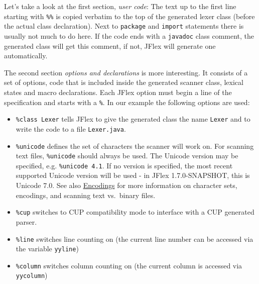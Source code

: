 
Let's take a look at the first section, \emph{user code}: The text up to
the first line starting with \texttt{\%\%} is copied verbatim to the top
of the generated lexer class (before the actual class declaration). Next
to \texttt{package} and \texttt{import} statements there is usually not
much to do here. If the code ends with a \texttt{javadoc} class comment,
the generated class will get this comment, if not, JFlex will generate
one automatically.


The second section \emph{options and declarations} is more interesting.
It consists of a set of options, code that is included inside the
generated scanner class, lexical states and macro declarations. Each
JFlex option must begin a line of the specification and starts with a
\texttt{\%}. In our example the following options are used:

\begin{itemize}
\item
  \texttt{\%class\ Lexer} tells JFlex to give the generated class the
  name \texttt{Lexer} and to write the code to a file
  \texttt{Lexer.java}.
\item
  \texttt{\%unicode} defines the set of characters the scanner will work
  on. For scanning text files, \texttt{\%unicode} should always be used.
  The Unicode version may be specified, e.g. \texttt{\%unicode\ 4.1}. If
  no version is specified, the most recent supported Unicode version
  will be used - in JFlex 1.7.0-SNAPSHOT, this is Unicode 7.0. See also
  \hyperref[sec:encodings]{Encodings} for more information on character
  sets, encodings, and scanning text vs.~binary files.
\item
  \texttt{\%cup} switches to CUP compatibility mode to interface with a
  CUP generated parser.
\item
  \texttt{\%line} switches line counting on (the current line number can
  be accessed via the variable \texttt{yyline})
\item
  \texttt{\%column} switches column counting on (the current column is
  accessed via \texttt{yycolumn})
\end{itemize}

